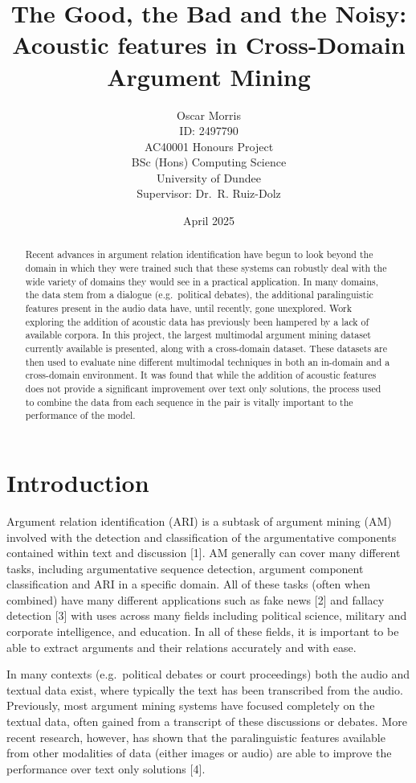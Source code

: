 \documentclass[twocolumn,twoside]{article}
\title{The Good, the Bad and the Noisy: Acoustic features in
Cross-Domain Argument Mining}
\author{Oscar
Morris\\ID: 2497790\\AC40001 Honours Project\\BSc (Hons) Computing Science\\University of Dundee\\Supervisor: Dr.~R.
Ruiz-Dolz}
\date{April 2025\vspace{5ex}}
\begin{document}
\maketitle



\begin{abstract}
Recent advances in argument relation identification have begun to look
beyond the domain in which they were trained such that these systems can
robustly deal with the wide variety of domains they would see in a
practical application. In many domains, the data stem from a dialogue
(e.g.~political debates), the additional paralinguistic features present
in the audio data have, until recently, gone unexplored. Work exploring
the addition of acoustic data has previously been hampered by a lack of
available corpora. In this project, the largest multimodal argument
mining dataset currently available is presented, along with a
cross-domain dataset. These datasets are then used to evaluate nine
different multimodal techniques in both an in-domain and a cross-domain
environment. It was found that while the addition of acoustic features
does not provide a significant improvement over text only solutions, the
process used to combine the data from each sequence in the pair is
vitally important to the performance of the model.
\end{abstract}


\section{Introduction}\label{introduction}

Argument relation identification (ARI) is a subtask of argument mining
(AM) involved with the detection and classification of the argumentative
components contained within text and discussion {[}1{]}. AM generally
can cover many different tasks, including argumentative sequence
detection, argument component classification and ARI in a specific
domain. All of these tasks (often when combined) have many different
applications such as fake news {[}2{]} and fallacy detection {[}3{]}
with uses across many fields including political science, military and
corporate intelligence, and education. In all of these fields, it is
important to be able to extract arguments and their relations accurately
and with ease.

In many contexts (e.g.~political debates or court proceedings) both the
audio and textual data exist, where typically the text has been
transcribed from the audio. Previously, most argument mining systems
have focused completely on the textual data, often gained from a
transcript of these discussions or debates. More recent research,
however, has shown that the paralinguistic features available from other
modalities of data (either images or audio) are able to improve the
performance over text only solutions {[}4{]}.
\end{document}
